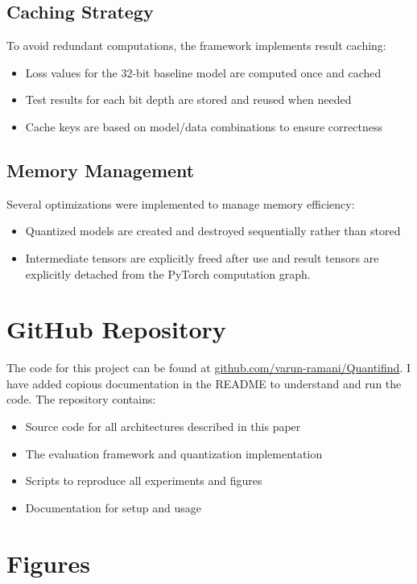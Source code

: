 \documentclass[twocolumn]{article}
\begin{document}
\subsection{Caching Strategy}
To avoid redundant computations, the framework implements result caching:
\begin{itemize}
\item Loss values for the 32-bit baseline model are computed once and cached
\item Test results for each bit depth are stored and reused when needed
\item Cache keys are based on model/data combinations to ensure correctness
\end{itemize}
\subsection{Memory Management}
Several optimizations were implemented to manage memory efficiency:
\begin{itemize}
\item Quantized models are created and destroyed sequentially rather than stored
\item Intermediate tensors are explicitly freed after use and result tensors are
explicitly detached from the PyTorch computation graph.
\end{itemize}

\section{GitHub Repository}
The code for this project can be found at
\href{https://github.com/varun-ramani/Quantifind}{github.com/varun-ramani/Quantifind}. I have added copious documentation in the README
to understand and run the code. The repository contains:
\begin{itemize}
\item Source code for all architectures described in this paper
\item The evaluation framework and quantization implementation
\item Scripts to reproduce all experiments and figures
\item Documentation for setup and usage
\end{itemize}

\clearpage
\onecolumn

\section{Figures}
\end{document}
